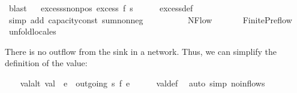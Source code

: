 \begin{isabellebody}
\ blast\isanewline
{}\isamarkupfalse%
%
\endisatagproof
{\isafoldproof}%
%
\isadelimproof
\ \isanewline
%
\endisadelimproof
\isanewline
{}\isamarkupfalse%
\ excess{\isacharunderscore}s{\isacharunderscore}non{\isacharunderscore}pos{\isacharcolon}\ {\isachardoublequoteopen}excess\ f\ s\ {\isasymle}\ {}{\isachardoublequoteclose}\isanewline
%
\isadelimproof
\ \ %
\endisadelimproof
%
\isatagproof
{}\isamarkupfalse%
\ excess{\isacharunderscore}def\isanewline
\ \ \isamarkupfalse%
\ {\isacharparenleft}simp\ add{\isacharcolon}\ capacity{\isacharunderscore}const\ sum{\isacharunderscore}nonneg{\isacharparenright}%
\endisatagproof
{\isafoldproof}%
%
\isadelimproof
\ \ \isanewline
%
\endisadelimproof
\ \ \ \ \isanewline
{}\isamarkupfalse%
\ %
\isanewline
\isanewline
{}\isamarkupfalse%
\ NFlow\ \ \ \isanewline
\ \ \isamarkupfalse%
\ Finite{\isacharunderscore}Preflow%
\isadelimproof
\ %
\endisadelimproof
%
\isatagproof
{}\isamarkupfalse%
\ unfold{\isacharunderscore}locales%
\endisatagproof
{\isafoldproof}%
%
\isadelimproof
%
\endisadelimproof
%
\begin{isamarkuptext}%
There is no outflow from the sink in a network. 
    Thus, we can simplify the definition of the value:%
\end{isamarkuptext}\isamarkuptrue%
\ \ \isamarkupfalse%
\ val{\isacharunderscore}alt{\isacharcolon}\ {\isachardoublequoteopen}val\ {\isacharequal}\ {\isacharparenleft}{\isasymSum}e\ {\isasymin}\ outgoing\ s{\isachardot}\ f\ e{\isacharparenright}{\isachardoublequoteclose}\isanewline
%
\isadelimproof
\ \ \ \ %
\endisadelimproof
%
\isatagproof
{}\isamarkupfalse%
\ val{\isacharunderscore}def\ \isamarkupfalse%
\ {\isacharparenleft}auto\ simp{\isacharcolon}\ no{\isacharunderscore}inflow{\isacharunderscore}s{\isacharparenright}%
\endisatagproof
{\isafoldproof}%
%
\isadelimproof
\isanewline
%
\endisadelimproof
\ \ \ \ \ \ \isanewline
{}\isamarkupfalse%
\ \ \isanewline
%
\isadelimtheory
\ \ \isanewline
%
\endisadelimtheory
%
\isatagtheory
{}\isamarkupfalse%
\ %
%
\endisatagtheory
{\isafoldtheory}%
%
\isadelimtheory
%
\endisadelimtheory
%
\end{isabellebody}%
